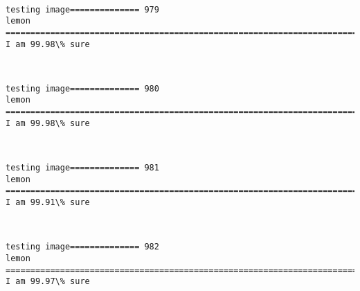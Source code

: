 \documentclass[11pt]{article}
\begin{document}
    \begin{center}
    \end{center}
    { \hspace*{\fill} \\}
    
    \begin{Verbatim}[commandchars=\\\{\}]
testing image============== 979
lemon
============================================================================
I am 99.98\% sure

    \end{Verbatim}

    \begin{center}
    \end{center}
    { \hspace*{\fill} \\}
    
    \begin{Verbatim}[commandchars=\\\{\}]
testing image============== 980
lemon
============================================================================
I am 99.98\% sure

    \end{Verbatim}

    \begin{center}
    \end{center}
    { \hspace*{\fill} \\}
    
    \begin{Verbatim}[commandchars=\\\{\}]
testing image============== 981
lemon
============================================================================
I am 99.91\% sure

    \end{Verbatim}

    \begin{center}
    \end{center}
    { \hspace*{\fill} \\}
    
    \begin{Verbatim}[commandchars=\\\{\}]
testing image============== 982
lemon
============================================================================
I am 99.97\% sure

    \end{Verbatim}
\end{document}
